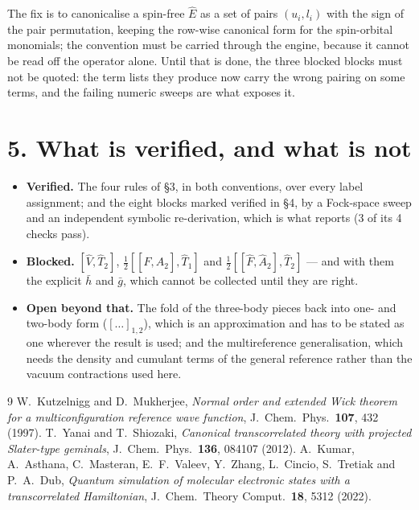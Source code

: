 \documentclass[11pt]{article}
\begin{document}
The fix is to canonicalise a spin-free $\hat E$ as a set of pairs $(u_i,l_i)$
with the sign of the pair permutation, keeping the row-wise canonical form for
the spin-orbital monomials; the convention must be carried through the engine,
because it cannot be read off the operator alone.
Until that is done, the three blocked blocks must not be quoted: the term lists
they produce now carry the wrong pairing on some terms, and the failing numeric
sweeps are what exposes it.

\section*{5. What is verified, and what is not}

\begin{itemize}
  \item \textbf{Verified.} The four rules of \S3, in both conventions, over
        every label assignment; and the eight blocks marked verified in \S4, by
        a Fock-space sweep and an independent symbolic re-derivation, which is
        what  reports (3 of its 4 checks pass).
  \item \textbf{Blocked.} $[\hat V,\hat T_2]$,
        $\tfrac12[[\hat F,\hat A_2],\hat T_1]$ and
        $\tfrac12[[\hat F,\hat A_2],\hat T_2]$ --- and with them the explicit
        $\bar h$ and $\bar g$, which cannot be collected until they are right.
  \item \textbf{Open beyond that.} The fold of the three-body pieces back into
        one- and two-body form ($[\dots]_{1,2}$), which is an approximation and
        has to be stated as one wherever the result is used; and the
        multireference generalisation, which needs the density and cumulant
        terms of the general reference rather than the vacuum contractions used
        here.
\end{itemize}

\begin{thebibliography}{9}
 W.~Kutzelnigg and D.~Mukherjee,
  \emph{Normal order and extended Wick theorem for a multiconfiguration
  reference wave function}, J.~Chem.~Phys.\ \textbf{107}, 432 (1997).
 T.~Yanai and T.~Shiozaki,
  \emph{Canonical transcorrelated theory with projected Slater-type geminals},
  J.~Chem.~Phys.\ \textbf{136}, 084107 (2012).
 A.~Kumar, A.~Asthana, C.~Masteran, E.~F.~Valeev,
  Y.~Zhang, L.~Cincio, S.~Tretiak and P.~A.~Dub,
  \emph{Quantum simulation of molecular electronic states with a
  transcorrelated Hamiltonian}, J.~Chem.~Theory Comput.\ \textbf{18}, 5312
  (2022).
\end{thebibliography}
\end{document}

